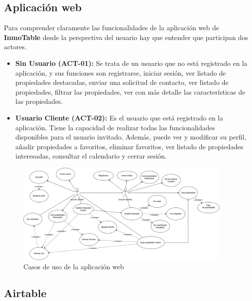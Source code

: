 \subsection{Aplicación web}

Para comprender claramente las funcionalidades de la aplicación web de \textbf{InmoTable} desde la perspectiva del usuario hay que entender que participan dos actores.

\begin{itemize}
    \item \textbf{Sin Usuario (ACT-01):} Se trata de un usuario que no está registrado en la aplicación, y sus funciones son registrarse, iniciar sesión, ver listado de propiedades destacadas, enviar una solicitud de contacto, ver listado de propiedades, filtrar las propiedades, ver con más detalle las características de las propiedades.

    \item \textbf{Usuario Cliente (ACT-02):} Es el usuario que está registrado en la aplicación. Tiene la capacidad de realizar todas las funcionalidades disponibles para el usuario invitado. Además, puede ver y modificar su perfil, añadir propiedades a favoritos, eliminar favoritos, ver listado de propiedades interesadas, consultar el calendario y cerrar sesión.
\end{itemize}

\begin{figure}[H]
    \begin{center}
        \includegraphics[width = 0.95\textwidth]{Figuras/diagrama_casos_de_uso_aplicacion_web.png}
    \end{center}
    \caption{\label{fig:diagrama_casos_de_uso_aplicacion_web} Casos de uso de la aplicación web}
\end{figure}

\subsection{Airtable}

